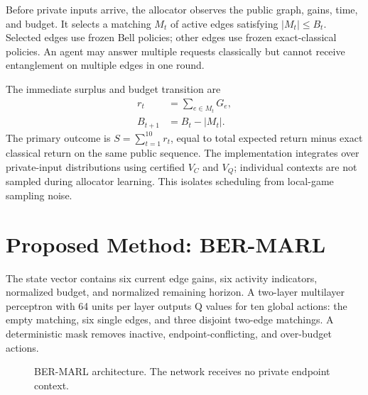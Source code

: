 \documentclass[10pt,twocolumn]{article}
\newcommand{\method}{\textsc{BER-MARL}}
\begin{document}
Before private inputs arrive, the allocator observes the public graph, gains, time, and budget. It selects a matching $M_t$ of active edges satisfying $|M_t|\leq B_t$. Selected edges use frozen Bell policies; other edges use frozen exact-classical policies. An agent may answer multiple requests classically but cannot receive entanglement on multiple edges in one round.

The immediate surplus and budget transition are
\begin{align}
 r_t &= \sum_{e\in M_t}G_e, \\
 B_{t+1} &= B_t-|M_t|.
\end{align}
The primary outcome is $S=\sum_{t=1}^{10}r_t$, equal to total expected return minus exact classical return on the same public sequence. The implementation integrates over private-input distributions using certified $V_C$ and $V_Q$; individual contexts are not sampled during allocator learning. This isolates scheduling from local-game sampling noise.

\section{Proposed Method: BER-MARL}
The state vector contains six current edge gains, six activity indicators, normalized budget, and normalized remaining horizon. A two-layer multilayer perceptron with 64 units per layer outputs Q values for ten global actions: the empty matching, six single edges, and three disjoint two-edge matchings. A deterministic mask removes inactive, endpoint-conflicting, and over-budget actions.

\begin{figure}[t]
\centering
{}
\caption{\method{} architecture. The network receives no private endpoint context.}
\label{fig:architecture}
\end{figure}
\end{document}
